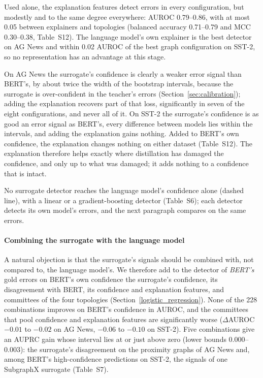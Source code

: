 \documentclass[preprint, times, review, 10pt]{elsarticle}
\begin{document}
Used alone, the explanation features detect errors in every configuration, but modestly and to the same degree everywhere: AUROC 0.79--0.86, with at most 0.05 between explainers and topologies (balanced accuracy 0.71--0.79 and MCC 0.30--0.38, Table~S12). The language model's own explainer is the best detector on AG News and within 0.02 AUROC of the best graph configuration on SST-2, so no representation has an advantage at this stage.

On AG News the surrogate's confidence is clearly a weaker error signal than BERT's, by about twice the width of the bootstrap intervals, because the surrogate is over-confident in the teacher's errors (Section~\ref{sec:calibration}); adding the explanation recovers part of that loss, significantly in seven of the eight configurations, and never all of it. On SST-2 the surrogate's confidence is as good an error signal as BERT's, every difference between models lies within the intervals, and adding the explanation gains nothing. Added to BERT's own confidence, the explanation changes nothing on either dataset (Table~S12). The explanation therefore helps exactly where distillation has damaged the confidence, and only up to what was damaged; it adds nothing to a confidence that is intact.

No surrogate detector reaches the language model's confidence alone (dashed line), with a linear or a gradient-boosting detector (Table~S6); each detector detects its own model's errors, and the next paragraph compares on the same errors.

\paragraph{Combining the surrogate with the language model}
A natural objection is that the surrogate's signals should be combined with, not compared to, the language model's. We therefore add to the detector of \emph{BERT's} gold errors on BERT's own confidence the surrogate's confidence, its disagreement with BERT, its confidence and explanation features, and committees of the four topologies (Section~\ref{logistic_regression}). None of the 228 combinations improves on BERT's confidence in AUROC, and the committees that pool confidence and explanation features are significantly worse (\(\Delta\)AUROC \(-0.01\) to \(-0.02\) on AG News, \(-0.06\) to \(-0.10\) on SST-2). Five combinations give an AUPRC gain whose interval lies at or just above zero (lower bounds 0.000--0.003): the surrogate's disagreement on the proximity graphs of AG News and, among BERT's high-confidence predictions on SST-2, the signals of one SubgraphX surrogate (Table~S7).
\end{document}
